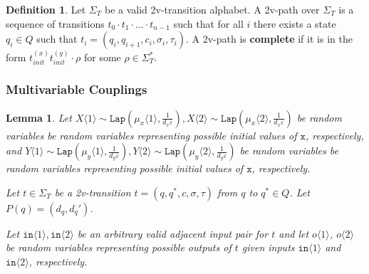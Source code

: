 \documentclass[12pt]{article}
\newcommand{\brangle}[1]{\langle #1 \rangle}
\newcommand{\Lap}{\texttt{Lap}}
\newtheorem{lemma}[thm]{Lemma}
\theoremstyle{definition}
\newtheorem{defn}[thm]{Definition}
\begin{document}
\begin{defn}
    Let $\Sigma_T$ be a valid 2v-transition alphabet. A 2v-path over $\Sigma_T$ is a sequence of transitions $t_0\cdot t_1\cdot \ldots \cdot t_{n-1}$ such that for all $i$ there exists a state $q_i\in Q$ such that $t_i = (q_i, q_{i+1}, c_i, \sigma_i, \tau_i)$. A 2v-path is \textbf{complete} if it is in the form $t_{init}^{(x)}t_{init}^{(y)}\cdot \rho$ for some $\rho\in \Sigma_T^*$.
\end{defn}

\subsubsection{Multivariable Couplings}



\begin{lemma}
    Let $X\brangle{1}\sim \Lap(\mu_x\brangle{1}, \frac{1}{d_x\varepsilon}), X\brangle{2}\sim\Lap(\mu_x\brangle{2}, \frac{1}{d_x\varepsilon})$ be random variables be random variables representing possible initial values of $\texttt{x}$, respectively, 
    and $Y\brangle{1}\sim \Lap(\mu_y\brangle{1}, \frac{1}{d_y\varepsilon}), Y\brangle{2}\sim\Lap(\mu_y\brangle{2}, \frac{1}{d_y\varepsilon})$ be random variables be random variables representing possible initial values of $\texttt{x}$, respectively. 

    Let $t\in \Sigma_T$ be a 2v-transition $t = (q, q^*, c, \sigma, \tau)$ from $q$ to $q^*\in Q$. Let $P(q) = (d_q, d_q')$.

    Let $\texttt{in}\brangle{1}, \texttt{in}\brangle{2}$ be an arbitrary valid adjacent input pair for $t$ and let $o\brangle{1}$, $o\brangle{2}$ be random variables representing possible outputs of $t$ given inputs $\texttt{in}\brangle{1}$ and $\texttt{in}\brangle{2}$, respectively. 


\end{lemma}
\end{document}
